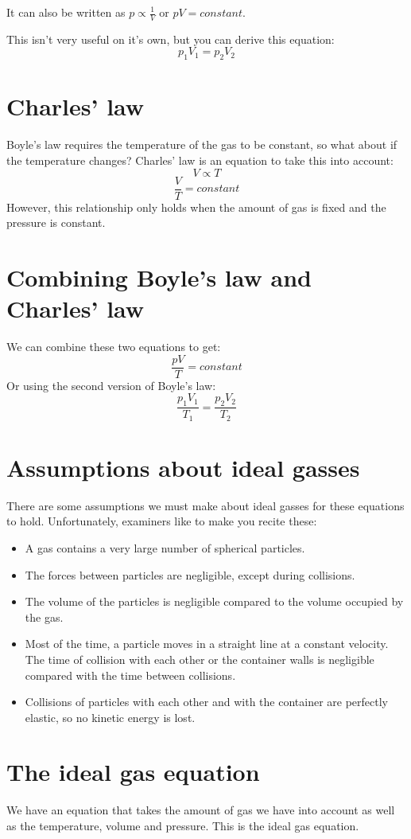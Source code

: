 \documentclass{article}
\begin{document}
It can also be written as $p \propto \frac{1}{V}$ or $pV = constant$.

This isn't very useful on it's own, but you can derive this equation:
\[
	p_1V_1 = p_2V_2
\]

\section*{Charles' law}
Boyle's law requires the temperature of the gas to be constant, so what about if the temperature changes? Charles' law is an equation to take this into account:
\[
	V \propto T
\]
\[
	\frac{V}{T} = constant
\]
However, this relationship only holds when the amount of gas is fixed and the pressure is constant.

\section*{Combining Boyle's law and Charles' law}
We can combine these two equations to get:
\[
	\frac{pV}{T} = constant
\]
Or using the second version of Boyle's law:
\[
	\frac{p_1V_1}{T_1} = \frac{p_2V_2}{T_2}
\]

\section*{Assumptions about ideal gasses}
There are some assumptions we must make about ideal gasses for these equations to hold. Unfortunately, examiners like to make you recite these:

\begin{itemize}
	\item A gas contains a very large number of spherical particles.
	\item The forces between particles are negligible, except during collisions.
	\item The volume of the particles is negligible compared to the volume occupied by the gas.
	\item Most of the time, a particle moves in a straight line at a constant velocity. The time of collision with each other or the container walls is negligible compared with the time between collisions.
	\item Collisions of particles with each other and with the container are perfectly elastic, so no kinetic energy is lost.
\end{itemize}

\section*{The ideal gas equation}
We have an equation that takes the amount of gas we have into account as well as the temperature, volume and pressure. This is the ideal gas equation.
\end{document}
